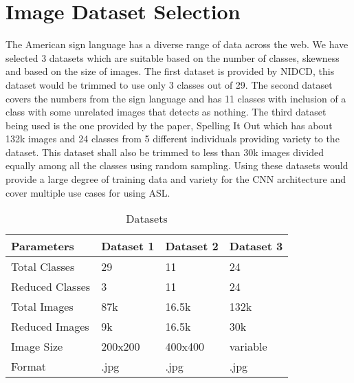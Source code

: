 \documentclass[10pt,twocolumn,letterpaper]{article}
\begin{document}
  \section{Image Dataset Selection}
  \label{sec:formatting}
The American sign language\cite{ASL} has a diverse range of data across the web. We have selected 3 datasets which are suitable based on the number of classes, skewness and based on the size of images. The first dataset is provided by NIDCD\cite{NIDCD}, this dataset would be trimmed to use only 3 classes out of 29. The second dataset covers the numbers from the sign language and has 11 classes with inclusion of a class with some unrelated images that detects as nothing.
The third dataset being used is the one provided by the paper, Spelling It Out\cite{SiO} which has about 132k images and 24 classes from 5 different individuals providing variety to the dataset. This dataset shall also be trimmed to less than 30k images divided equally among all the classes using random sampling. Using these datasets would provide a large degree of training data and variety for the CNN architecture and cover multiple use cases for using ASL.

  \begin{table}
    \centering
    \begin{tabular}{l l l l}
      \toprule
      Parameters & Dataset 1\cite{D1} & Dataset 2\cite{SLfN} & Dataset 3\cite{D3}\\
      \midrule
      Total Classes & 29 & 11 & 24\\
      Reduced Classes & 3  & 11 & 24 \\
      Total Images & 87k & 16.5k & 132k \\
      Reduced Images & 9k & 16.5k & 30k \\
      Image Size & 200x200  & 400x400 & variable\\
      Format & .jpg & .jpg & .jpg \\
      \bottomrule
    \end{tabular}
    \caption{Datasets}
    \label{tab:example}
  \end{table}


\end{document}
